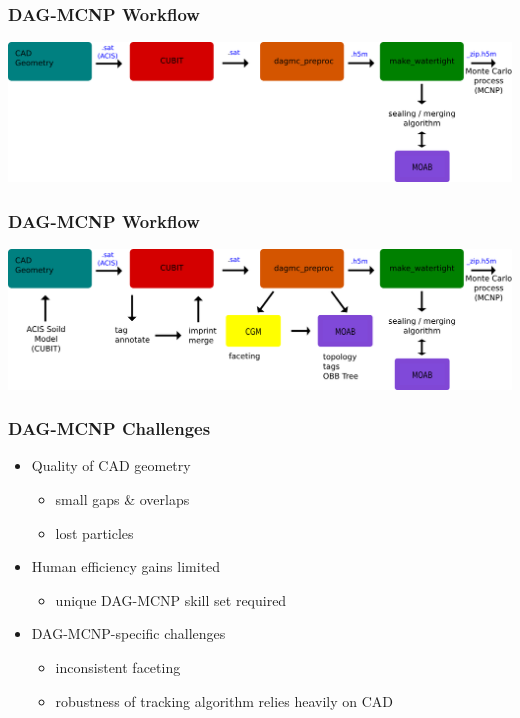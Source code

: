 \documentclass[14pt]{beamer}
\begin{document}
\begin{frame}
\frametitle{DAG-MCNP Workflow}
\begin{center}
\includegraphics[scale=0.23, trim = 40 200 0 0]{DAGMC_Wrkflw5.png}
\end{center}
\end{frame}

\begin{frame}
\frametitle{DAG-MCNP Workflow}
\begin{center}
\includegraphics[scale=0.23, trim = 40 200 0 0]{DAGMC_Wrkflw6.png}
\end{center}
\end{frame}


\begin{frame}
\frametitle{DAG-MCNP Challenges}
\begin{itemize}
\vfill
\item Quality of CAD geometry
	\begin{itemize}
	\item small gaps \& overlaps
	\item lost particles
	\end{itemize}
\vfill
\item Human efficiency gains limited
	\begin{itemize}
	\item unique DAG-MCNP skill set required
	\end{itemize}
\vfill
\item DAG-MCNP-specific challenges
	\begin{itemize}
	\item inconsistent faceting
	\item robustness of tracking algorithm relies heavily on CAD
	\end{itemize}
\end{itemize}
\end{frame}
\end{document}

